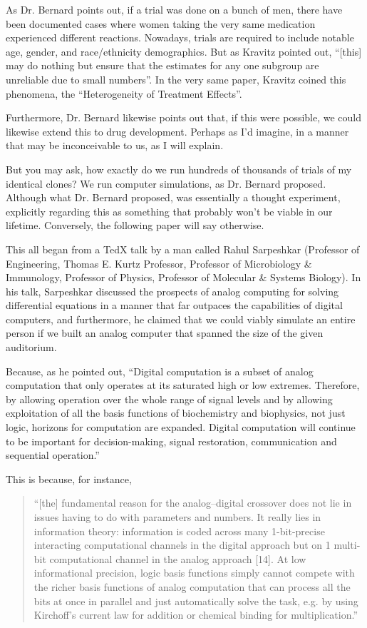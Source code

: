 As Dr. Bernard points out, if a trial was done on a bunch of men, there have been documented cases where women taking the very same medication experienced different reactions. Nowadays, trials are required to include notable age, gender, and race/ethnicity demographics. But as Kravitz pointed out, ``[this] may do nothing but ensure that the estimates for any one subgroup are unreliable due to small numbers''. In the very same paper, Kravitz coined this phenomena, the ``Heterogeneity of Treatment Effects''. 

Furthermore, Dr. Bernard likewise points out that, if this were possible, we could likewise extend this to drug development. Perhaps as I'd imagine, in a manner that may be inconceivable to us, as I will explain.

But you may ask, how exactly do we run hundreds of thousands of trials of my identical clones? We run computer simulations, as Dr. Bernard proposed. Although what Dr. Bernard proposed, was essentially a thought experiment, explicitly regarding this as something that probably won't be viable in our lifetime. Conversely, the following paper will say otherwise. 

This all began from a TedX talk by a man called Rahul Sarpeshkar (Professor of Engineering, Thomas E. Kurtz Professor, Professor of Microbiology \& Immunology, Professor of Physics, Professor of Molecular \& Systems Biology). In his talk, Sarpeshkar discussed the prospects of analog computing for solving differential equations in a manner that far outpaces the capabilities of digital computers, and furthermore, he claimed that we could viably simulate an entire person if we built an analog computer that spanned the size of the given auditorium.

Because, as he pointed out, ``Digital computation is a subset of analog computation that only operates at its saturated high or low extremes. Therefore, by allowing operation over the whole range of signal levels and by allowing exploitation of all the basis functions of biochemistry and biophysics, not just logic, horizons for computation are expanded. Digital computation will continue to be important for decision-making, signal restoration, communication and sequential operation.''

This is because, for instance, \begin{quotation}
    ``[the] fundamental reason for the analog–digital crossover does not lie in issues having to do with parameters and numbers. It really lies in information theory: information is coded across many 1-bit-precise interacting computational channels in the digital approach but on 1 multi-bit computational channel in the analog approach [14]. At low informational precision, logic basis functions simply cannot compete with the richer basis functions of analog computation that can process all the bits at once in parallel and just automatically solve the task, e.g. by using Kirchoff’s current law for addition or chemical binding for multiplication.''
\end{quotation}

